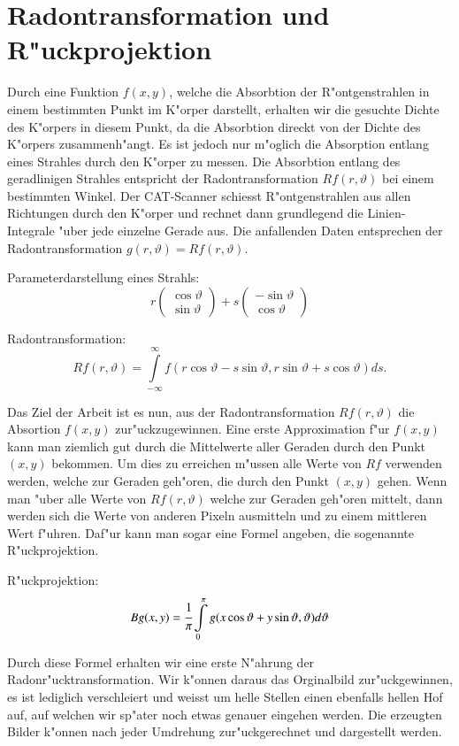 \section{Radontransformation und R"uckprojektion}
Durch eine Funktion $f(x,y)$, welche die Absorbtion der R"ontgenstrahlen
in einem bestimmten Punkt im K"orper darstellt, erhalten wir die gesuchte
Dichte des K"orpers in diesem Punkt, da die Absorbtion direckt von der
Dichte des K"orpers zusammenh"angt.
Es ist jedoch nur m"oglich die Absorption entlang eines Strahles durch
den K"orper zu messen. Die Absorbtion entlang des geradlinigen Strahles
entspricht der Radontransformation $Rf(r,\vartheta)$ bei einem bestimmten
Winkel.
Der CAT-Scanner schiesst R"ontgenstrahlen aus allen Richtungen durch
den K"orper und rechnet dann grundlegend die Linien-Integrale "uber
jede einzelne Gerade aus. Die anfallenden Daten entsprechen der
Radontransformation $g(r,\vartheta) = Rf(r,\vartheta)$. 

Parameterdarstellung eines Strahls:
\begin{equation}
	r
	\begin{pmatrix}
		\cos{\vartheta} \\ \sin{\vartheta}
	\end{pmatrix}
	+ s
	\begin{pmatrix}
		-\sin{\vartheta} \\ \cos{\vartheta}
	\end{pmatrix}
\end{equation}

Radontransformation:
\begin{equation}
	Rf(r,\vartheta) = \int\limits_{-\infty}^{\infty} f(r\cos{\vartheta}-s\sin{\vartheta},r\sin{\vartheta}+s\cos{\vartheta})ds.
\end{equation}

Das Ziel der Arbeit ist es nun, aus der Radontransformation
$Rf(r,\vartheta)$ die Absortion $f(x,y)$ zur"uckzugewinnen.
Eine erste Approximation f"ur $f(x,y)$ kann man ziemlich gut durch die
Mittelwerte aller Geraden durch den Punkt $(x,y)$ bekommen.
Um dies zu erreichen m"ussen alle Werte von $Rf$ verwenden werden,
welche zur Geraden geh"oren, die durch den Punkt $(x,y)$ gehen. Wenn
man "uber alle Werte von $Rf(r,\vartheta)$ welche zur Geraden geh"oren
mittelt, dann werden sich die Werte von anderen Pixeln ausmitteln und zu
einem mittleren Wert f"uhren. Daf"ur kann man sogar eine Formel angeben,
die sogenannte R"uckprojektion.

R"uckprojektion:
\begin{equation}
	Bg(x,y) = \cfrac{1}{\pi}\int\limits_0^\pi g(x\cos{\vartheta}+y\sin{\vartheta},\vartheta) d\vartheta
\end{equation}

Durch diese Formel erhalten wir eine erste N"ahrung der
Radonr"ucktransformation. Wir k"onnen daraus das Orginalbild
zur"uckgewinnen, es ist lediglich verschleiert und weisst um helle
Stellen einen ebenfalls hellen Hof auf, auf welchen wir sp"ater noch
etwas genauer eingehen werden. Die erzeugten Bilder k"onnen nach jeder
Umdrehung zur"uckgerechnet und dargestellt werden.

